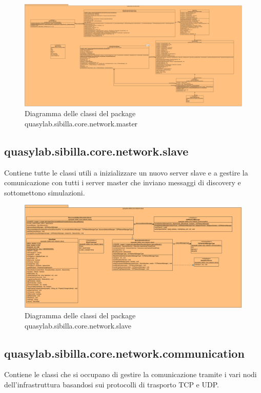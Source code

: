 \begin{figure}[H]
    \includegraphics[width=\linewidth]{images/quasylab.sibilla.core.network.master.png}
    \captionsetup{justification=centering}
    \caption{Diagramma delle classi del package quasylab.sibilla.core.network.master}
  \end{figure}

\subsection{quasylab.sibilla.core.network.slave} Contiene tutte le classi utili a inizializzare un nuovo server slave e a gestire la comunicazione con tutti i server master che inviano messaggi di discovery e sottomettono simulazioni.

\begin{figure}[H]
    \includegraphics[width=\linewidth]{images/quasylab.sibilla.core.network.slave.png}
    \captionsetup{justification=centering}
    \caption{Diagramma delle classi del package quasylab.sibilla.core.network.slave}
  \end{figure}

\subsection{quasylab.sibilla.core.network.communication} Contiene le classi che si occupano di gestire la comunicazione tramite i vari nodi dell’infrastruttura basandosi sui protocolli di trasporto TCP e UDP. 

